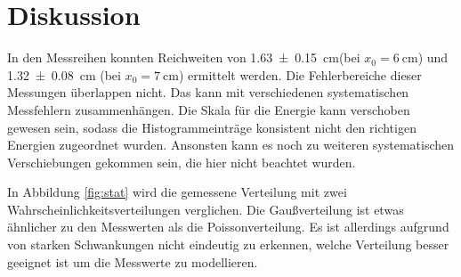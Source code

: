 \section{Diskussion}
In den Messreihen konnten Reichweiten von \qty{1.63 \pm 0.15}{\cm}(bei $x_0 = \qty{6}{\cm}$)  und 
\qty{1.32 \pm 0.08}{\cm} (bei $x_0 = \qty{7}{\cm}$) ermittelt werden.
Die Fehlerbereiche dieser Messungen überlappen nicht.
Das kann mit verschiedenen systematischen Messfehlern zusammenhängen.
Die Skala für die Energie kann verschoben gewesen sein, sodass die Histogrammeinträge
konsistent nicht den richtigen Energien zugeordnet wurden.
Ansonsten kann es noch zu weiteren systematischen Verschiebungen gekommen sein, die hier nicht beachtet wurden.

In Abbildung \ref{fig:stat} wird die gemessene Verteilung mit zwei Wahrscheinlichkeitsverteilungen verglichen.
Die Gaußverteilung ist etwas ähnlicher zu den Messwerten als die Poissonverteilung.
Es ist allerdings aufgrund von starken Schwankungen nicht eindeutig zu erkennen, welche Verteilung besser geeignet ist um
die Messwerte zu modellieren.
